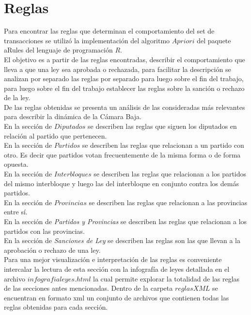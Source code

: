 \documentclass{endm}
\begin{document}
\section{Reglas}\label{desarrollo}

Para encontrar las reglas que determinan el comportamiento del set de transacciones se utilizó la implementación del algoritmo $Apriori$ del paquete aRules del lenguaje de programación $R$.\\

El objetivo es a partir de las reglas encontradas, describir el comportamiento que lleva a que una ley sea aprobada o rechazada, para facilitar la descripción se analizan por separado las reglas por separado para luego sobre el fin del trabajo, para luego sobre el fin del trabajo establecer las reglas sobre la sanción o rechazo de la ley.\\

De las reglas obtenidas se presenta un análisis de las consideradas más relevantes para describir la dinámica de la Cámara Baja. \\

En la sección de $Diputados$ se describen las reglas que siguen los diputados en relación al partido que pertenecen.\\

En la sección de $Partidos$ se describen las reglas que relacionan a un partido con otro. Es decir que partidos votan frecuentemente de la misma forma o de forma opuesta.\\

En la sección de $Interbloques$ se describen las reglas que relacionan a los partidos del mismo interbloque y luego las del interbloque en conjunto contra los demás partidos.\\

En la sección de $Provincias$ se describen las reglas que relacionan a las provincias entre sí.\\

En la sección de \textit{Partidos y Provincias} se describen las reglas que relacionan a los partidos con las provincias.\\

En la sección de \textit{Sanciones de Ley} se describen las reglas son las que llevan a la aprobación o rechazo de una ley.\\

Para una mejor visualización e interpretación de las reglas es conveniente intercalar la lectura de esta sección con la infografía de leyes detallada en el archivo \textbf{$infografia leyes.html$} la cual permite explorar la totalidad de las reglas de las secciones antes mencionadas. Dentro de la carpeta \textbf{$reglas XML$} se encuentran en formato xml un conjunto de archivos que contienen todas las reglas obtenidas para cada sección.\\
\end{document}
